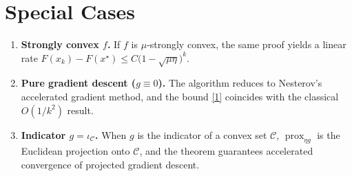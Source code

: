 \documentclass{article}
\newcommand{\prox}{\operatorname{prox}}
\begin{document}
\section*{Special Cases}
\begin{enumerate}[label=\alph*)]
\item \textbf{Strongly convex $f$.}  
If $f$ is $\mu$‑strongly convex, the same proof yields a linear rate
$F(x_k)-F(x^{\star})\le C\bigl(1-\sqrt{\mu\eta}\bigr)^{k}$.
\item \textbf{Pure gradient descent ($g\equiv0$).}  
The algorithm reduces to Nesterov’s accelerated gradient method,
and the bound \eqref{1} coincides with the classical $O(1/k^{2})$ result.
\item \textbf{Indicator $g=\iota_{\mathcal{C}}$.}  
When $g$ is the indicator of a convex set $\mathcal{C}$, $\prox_{\eta g}$ is the Euclidean
projection onto $\mathcal{C}$, and the theorem guarantees accelerated convergence of
projected gradient descent.
\end{enumerate}
\end{document}
